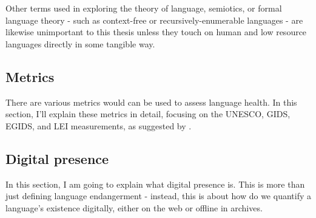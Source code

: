 Other terms used in exploring the theory of language, semiotics, or formal language theory - such as context-free or recursively-enumerable languages - are likewise unimportant to this thesis unless they touch on human and low resource languages directly in some tangible way.

\subsection{Metrics}
\label{subsec:metrics}

There are various metrics would can be used to assess language health. In this section, I'll explain these metrics in detail, focusing on the UNESCO, GIDS, EGIDS, and LEI measurements, as suggested by \citet{yang2017toward}.






\subsection{Digital presence}



In this section, I am going to explain what digital presence is. This is more than just defining language endangerment - instead, this is about how do we quantify a language's existence digitally, either on the web or offline in archives.

